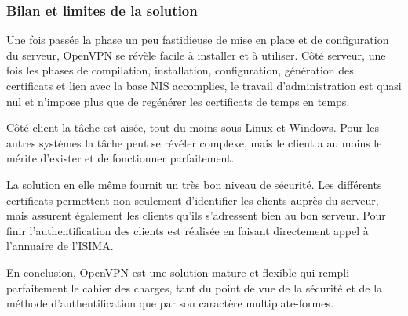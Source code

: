 \subsubsection{Bilan et limites de la solution}

Une fois passée la phase un peu fastidieuse de mise en place et de configuration du serveur, OpenVPN se révèle facile à installer et à utiliser. Côté serveur, une fois les phases de compilation, installation, configuration, génération des certificats et lien avec la base NIS accomplies, le travail d'administration est quasi nul et n'impose plus que de regénérer les certificats de temps en temps.

Côté client la tâche est aisée, tout du moins sous Linux et Windows. Pour les autres systèmes la tâche peut se révéler complexe, mais le client a au moins le mérite d'exister et de fonctionner parfaitement.

La solution en elle même fournit un très bon niveau de sécurité. Les différents certificats permettent non seulement d'identifier les clients auprès du serveur, mais assurent également les clients qu'ils s'adressent bien au bon serveur. Pour finir l'authentification des clients est réalisée en faisant directement appel à l'annuaire de l'ISIMA.

En conclusion, OpenVPN est une solution mature et flexible qui rempli parfaitement le cahier des charges, tant du point de vue de la sécurité et de la méthode d'authentification que par son caractère multiplate-formes.


% 
